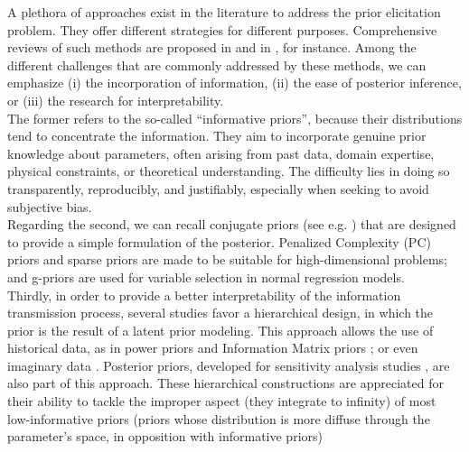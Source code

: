 A plethora of approaches exist in the literature to address the prior elicitation problem. They offer different strategies for different purposes. 
Comprehensive reviews of such methods are proposed in \cite{mikkola_prior_2023}
and in \cite{consonni_prior_2018}, for instance.
Among the different challenges that are commonly addressed by these methods, we can emphasize (i) the incorporation of information, (ii) the ease of posterior inference, or (iii) the research for interpretability.\\
The former refers to the so-called ``informative priors'', because their distributions tend to concentrate the information. %
They aim to incorporate genuine prior knowledge about parameters, often arising from past data, domain expertise, physical constraints, or theoretical understanding. %
The difficulty lies in doing so transparently, reproducibly, and justifiably, especially when seeking to avoid subjective bias.\\
Regarding the second, we can recall conjugate priors (see e.g. \cite{robert_bayesian_2007}) that are designed to provide a simple formulation of the posterior. Penalized Complexity (PC) priors \citep{simpson_penalising_2017} and sparse priors \citep{castillo_bayesian_2015} are made to be suitable for high-dimensional problems; and g-priors \citep{liang_mixtures_2008} are used for variable selection in normal regression models.\\
Thirdly, in order to provide a better interpretability of the information transmission process, several studies favor a hierarchical design, in which the prior is the result of a latent prior modeling. This approach allows the use of historical data, as in power priors \citep{chen_relationship_2006} and Information Matrix priors \citep{gupta_information_2009}; or even imaginary data \citep{perez_expectedposterior_2002,spitzner_neutral-data_2011}. Posterior priors, developed for sensitivity analysis studies \citep{bousquet_discussion_2024}, are also part of this approach. %
These hierarchical constructions are appreciated for their ability to tackle the improper aspect (they integrate to infinity) of most low-informative priors
(priors whose distribution is more diffuse through the parameter's space, in opposition with informative priors)



